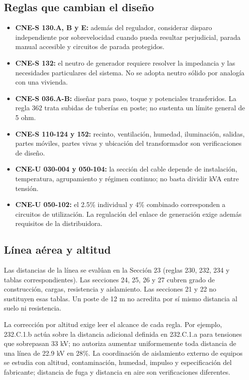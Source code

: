 \subsection{Reglas que cambian el diseño}
\begin{itemize}
\item \textbf{CNE-S 130.A, B y E:} además del regulador, considerar disparo independiente por sobrevelocidad cuando pueda resultar perjudicial, parada manual accesible y circuitos de parada protegidos.
\item \textbf{CNE-S 132:} el neutro de generador requiere resolver la impedancia y las necesidades particulares del sistema. No se adopta neutro sólido por analogía con una vivienda.
\item \textbf{CNE-S 036.A-B:} diseñar para paso, toque y potenciales transferidos. La regla 362 trata subidas de tuberías en poste; no sustenta un límite general de 5 ohm.
\item \textbf{CNE-S 110-124 y 152:} recinto, ventilación, humedad, iluminación, salidas, partes móviles, partes vivas y ubicación del transformador son verificaciones de diseño.
\item \textbf{CNE-U 030-004 y 050-104:} la sección del cable depende de instalación, temperatura, agrupamiento y régimen continuo; no basta dividir kVA entre tensión.
\item \textbf{CNE-U 050-102:} el 2.5\% individual y 4\% combinado corresponden a circuitos de utilización. La regulación del enlace de generación exige además requisitos de la distribuidora.
\end{itemize}

\subsection{Línea aérea y altitud}
Las distancias de la línea se evalúan en la Sección 23 (reglas 230, 232, 234 y tablas correspondientes). Las secciones 24, 25, 26 y 27 cubren grado de construcción, cargas, resistencia y aislamiento. Las secciones 21 y 22 no sustituyen esas tablas. Un poste de 12 m no acredita por sí mismo distancia al suelo ni resistencia.

La corrección por altitud exige leer el alcance de cada regla. Por ejemplo, 232.C.1.b actúa sobre la distancia adicional definida en 232.C.1.a para tensiones que sobrepasan 33 kV; no autoriza aumentar uniformemente toda distancia de una línea de 22.9 kV en 28\%. La coordinación de aislamiento externo de equipos se estudia con altitud, contaminación, humedad, impulso y especificación del fabricante; distancia de fuga y distancia en aire son verificaciones diferentes.

